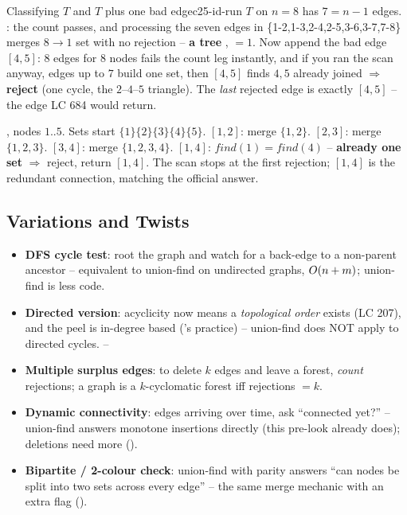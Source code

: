 \begin{example}{Classifying $T$ and $T$ plus one bad edge}{c25-id-run}
$T$ on $n=8$ has $7=n-1$ edges. : the count passes, and processing the seven edges in
\{1-2,1-3,2-4,2-5,3-6,3-7,7-8\} merges $8\!\to\!1$ set with no rejection -- \textbf{a tree}
\checkmark, $=1$. Now append the bad edge $[4,5]$: $8$ edges for $8$ nodes
fails the count leg instantly, and if you ran the scan anyway, edges up to $7$ build one set, then
$[4,5]$ finds $4,5$ already joined $\Rightarrow$ \textbf{reject} (one cycle, the
$2\text{--}4\text{--}5$ triangle). The \emph{last} rejected edge is exactly $[4,5]$ -- the edge LC
684 would return.
\end{example}
\begin{tracebox}
, nodes $1..5$. Sets start $\{1\}\{2\}\{3\}\{4\}\{5\}$.
$[1,2]$: merge $\{1,2\}$. $[2,3]$: merge $\{1,2,3\}$. $[3,4]$: merge $\{1,2,3,4\}$. $[1,4]$:
$\mathit{find}(1)=\mathit{find}(4)$ -- \textbf{already one set} $\Rightarrow$ reject, return $[1,4]$. The scan stops
at the first rejection; $[1,4]$ is the redundant connection, matching the official answer. \checkmark
\end{tracebox}

\subsection{Variations and Twists}

\begin{itemize}[nosep]
  \item \textbf{DFS cycle test}: root the graph and watch for a back-edge to a non-parent ancestor --
        equivalent to union-find on undirected graphs, $O(n+m)$; union-find is less code. \hfill{}
  \item \textbf{Directed version}: acyclicity now means a \emph{topological order} exists (LC 207),
        and the peel is in-degree based ('s practice) -- union-find does NOT apply
        to directed cycles. \hfill{}--
  \item \textbf{Multiple surplus edges}: to delete $k$ edges and leave a forest, \emph{count} rejections;
        a graph is a $k$-cyclomatic forest iff rejections $=k$. \hfill{}
  \item \textbf{Dynamic connectivity}: edges arriving over time, ask ``connected yet?'' -- union-find
        answers monotone insertions directly (this pre-look already does); deletions need more (). \hfill{}
  \item \textbf{Bipartite / 2-colour check}: union-find with parity answers ``can nodes be split into
        two sets across every edge'' -- the same merge mechanic with an extra flag (). \hfill{}
\end{itemize}

